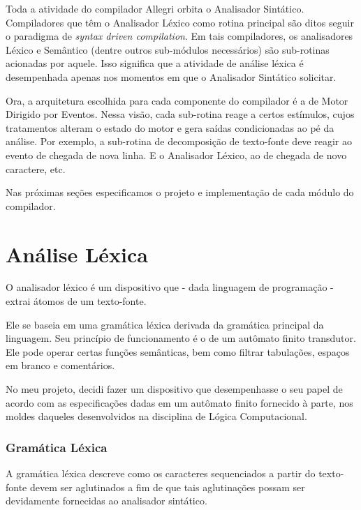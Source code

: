 \documentclass[a4paper,12pt]{report}
\begin{document}
    Toda a atividade do compilador Allegri orbita o Analisador Sintático. Compiladores que têm o Analisador Léxico como rotina principal são ditos seguir o paradigma de \textit{syntax driven compilation}. Em tais compiladores, os analisadores Léxico e Semântico (dentre outros sub-módulos necessários) são sub-rotinas acionadas por aquele. Isso significa que a atividade de análise léxica é desempenhada apenas nos momentos em que o Analisador Sintático solicitar.

    Ora, a arquitetura escolhida para cada componente do compilador é a de Motor Dirigido por Eventos. Nessa visão, cada sub-rotina reage a certos estímulos, cujos tratamentos alteram o estado do motor e gera saídas condicionadas ao pé da análise. Por exemplo, a sub-rotina de decomposição de texto-fonte deve reagir ao evento de chegada de nova linha. E o Analisador Léxico, ao de chegada de novo caractere, etc.

    Nas próximas seções especificamos o projeto e implementação de cada módulo do compilador.


    \chapter*{Análise Léxica}
    O analisador léxico é um dispositivo que - dada linguagem de programação - extrai átomos de um texto-fonte.

    Ele se baseia em uma gramática léxica derivada da gramática principal da linguagem. Seu princípio de funcionamento é o de um autômato finito transdutor. Ele pode operar certas funções semânticas, bem como filtrar tabulações, espaços em branco e comentários.

    No meu projeto, decidi fazer um dispositivo que desempenhasse o seu papel de acordo com as especificações dadas em um autômato finito fornecido à parte, nos moldes daqueles desenvolvidos na disciplina de Lógica Computacional.

    \subsection*{Gramática Léxica}
    A gramática léxica descreve como os caracteres sequenciados a partir do texto-fonte devem ser aglutinados a fim de que tais aglutinações possam ser devidamente fornecidas ao analisador sintático.
    
\end{document}
